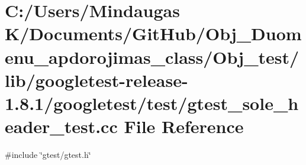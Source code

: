 \hypertarget{_obj__test_2lib_2googletest-release-1_88_81_2googletest_2test_2gtest__sole__header__test_8cc}{}\section{C\+:/\+Users/\+Mindaugas K/\+Documents/\+Git\+Hub/\+Obj\+\_\+\+Duomenu\+\_\+apdorojimas\+\_\+class/\+Obj\+\_\+test/lib/googletest-\/release-\/1.8.1/googletest/test/gtest\+\_\+sole\+\_\+header\+\_\+test.cc File Reference}
\label{_obj__test_2lib_2googletest-release-1_88_81_2googletest_2test_2gtest__sole__header__test_8cc}
{\ttfamily \#include \char`\"{}gtest/gtest.\+h\char`\"{}}\newline
